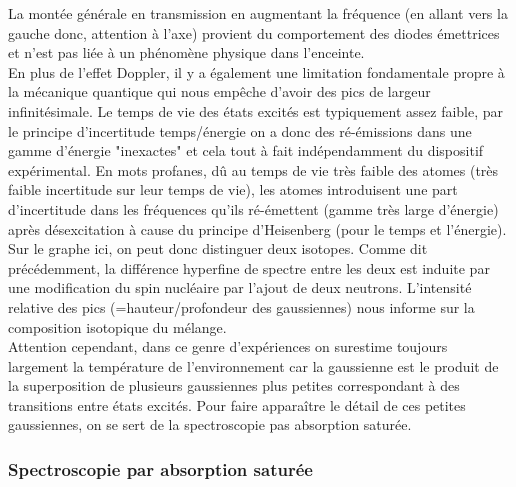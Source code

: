 La montée générale en transmission en augmentant la fréquence (en allant vers la gauche donc, attention à l'axe) provient du comportement des diodes émettrices et n'est pas liée à un phénomène physique dans l'enceinte.\\

En plus de l'effet Doppler, il y a également une limitation fondamentale propre à la mécanique quantique qui nous empêche d'avoir des pics de largeur infinitésimale. Le temps de vie des états excités est typiquement assez faible, par le principe d'incertitude temps/énergie on a donc des ré-émissions dans une gamme d'énergie "inexactes" et cela tout à fait indépendamment du dispositif expérimental. En mots profanes, dû au temps de vie très faible des atomes (très faible incertitude sur leur temps de vie), les atomes introduisent une part d'incertitude dans les fréquences qu'ils ré-émettent (gamme très large d'énergie) après désexcitation à cause du principe d'Heisenberg (pour le temps et l'énergie).\\

Sur le graphe ici, on peut donc distinguer deux isotopes. Comme dit précédemment, la différence hyperfine de spectre entre les deux est induite par une modification du spin nucléaire par l'ajout de deux neutrons. L'intensité relative des pics (=hauteur/profondeur des gaussiennes) nous informe sur la composition isotopique du mélange.\\

Attention cependant, dans ce genre d'expériences on surestime toujours largement la température de l'environnement car la gaussienne est le produit de la superposition de plusieurs gaussiennes plus petites correspondant à des transitions entre états excités. Pour faire apparaître le détail de ces petites gaussiennes, on se sert de la spectroscopie pas absorption saturée.


\subsubsection{Spectroscopie par absorption saturée}


